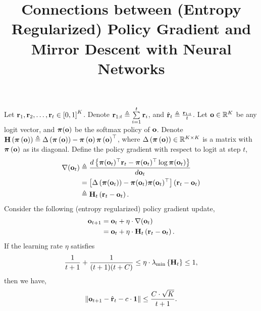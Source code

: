 \documentclass[10pt]{article}
\title{Connections between (Entropy Regularized) Policy Gradient and Mirror Descent with Neural Networks}
\author{}
\date{}
\begin{document}
\maketitle

\begin{lem}
Let ${\mathbf{r}}_1, {\mathbf{r}}_2, \dots, {\mathbf{r}}_t \in \left[ 0, 1  \right]^K$. Denote ${\mathbf{r}}_{1:t} \triangleq \sum\limits_{i=1}^{t}{{\mathbf{r}}_i}$, and $\hat{{\mathbf{r}}}_t \triangleq \frac{{\mathbf{r}}_{1:t}}{t}$. Let ${\mathbf{o}} \in {\mathbb{R}}^K$ be any logit vector, and ${\boldsymbol{\pi}}({\mathbf{o}})$ be the softmax policy of ${\mathbf{o}}$. Denote ${\mathbf{H}}\left( {\boldsymbol{\pi}} \left({\mathbf{o}} \right) \right) \triangleq \Delta \left( {\boldsymbol{\pi}} \left({\mathbf{o}} \right) \right) - {\boldsymbol{\pi}} \left({\mathbf{o}} \right) {\boldsymbol{\pi}} \left({\mathbf{o}} \right)^\top$, where $\Delta \left( {\boldsymbol{\pi}} \left({\mathbf{o}} \right) \right) \in {\mathbb{R}}^{K \times K}$ is a matrix with ${\boldsymbol{\pi}} \left({\mathbf{o}} \right)$ as its diagonal. Define the policy gradient with respect to logit at step $t$,
\begin{equation*}
\begin{split}
    \nabla({\mathbf{o}}_t) &\triangleq \frac{d \left\{ {\boldsymbol{\pi}}({\mathbf{o}}_t)^\top {\mathbf{r}}_t - {\boldsymbol{\pi}}({\mathbf{o}}_t)^\top \log{{\boldsymbol{\pi}}({\mathbf{o}}_t)} \right\} }{d {\mathbf{o}}_t} \\
    &= \left[ \Delta \left( {\boldsymbol{\pi}}({\mathbf{o}}_t) \right) - {\boldsymbol{\pi}}({\mathbf{o}}_t) {\boldsymbol{\pi}}({\mathbf{o}}_t)^\top \right] \left( {\mathbf{r}}_t - {\mathbf{o}}_t \right) \\
    &\triangleq {\mathbf{H}}_t \left( {\mathbf{r}}_t - {\mathbf{o}}_t \right).
\end{split}
\end{equation*}
Consider the following (entropy regularized) policy gradient update,
\begin{equation*}
\begin{split}
    {\mathbf{o}}_{t+1} &= {\mathbf{o}}_t + \eta \cdot \nabla({\mathbf{o}}_t) \\
    &= {\mathbf{o}}_t + \eta \cdot {\mathbf{H}}_t \left( {\mathbf{r}}_t - {\mathbf{o}}_t \right).
\end{split}
\end{equation*}
If the learning rate $\eta$ satisfies
\begin{equation*}
    \frac{1}{t+1} + \frac{1}{(t+1)(t+C)} \le \eta \cdot \lambda_{\min}\left\{ {\mathbf{H}}_t \right\} \le 1,
\end{equation*}
then we have,
\begin{equation*}
    \left\| {\mathbf{o}}_{t+1} - \hat{{\mathbf{r}}}_{t} - c \cdot {\mathbf{1}} \right\| \le \frac{C \cdot \sqrt{K}}{t+1}.
\end{equation*}
\end{lem}
\end{document}
